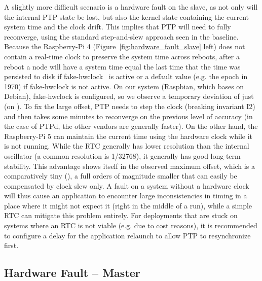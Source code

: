A slightly more difficult scenario is a hardware fault on the slave, as not only will the internal PTP state be lost, but also the kernel state containing the current system time and the clock drift. This implies that PTP will need to fully reconverge, using the standard step-and-slew approach seen in the baseline. Because the Raspberry-Pi 4 (Figure~\ref{fig:hardware_fault_slave} left) does not contain a real-time clock to preserve the system time across reboots, after a reboot a node will have a system time equal the last time that the time was persisted to disk if fake-hwclock~\cite{fake-hwclock-manpage} is active or a default value (e.g. the epoch in 1970) if fake-hwclock is not active. On our system (Raspbian, which bases on Debian), fake-hwclock is configured, so we observe a temporary deviation of just \fTimeMin{\cmpMax} (on \fVendor{\cmpMaxArg}). To fix the large offset, PTP needs to step the clock (breaking invariant I2) and then takes some minutes to reconverge on the previous level of accuracy (in the case of PTPd, the other vendors are generally faster). On the other hand, the Raspberry-Pi 5 can maintain the current time using the hardware clock while it is not running. While the RTC generally has lower resolution than the internal oscillator (a common resolution is 1/32768), it generally has good long-term stability. This advantage shows itself in the observed maximum offset, which is a comparatively tiny \fTime{\cmpMax} (\fVendor{\cmpMaxArg}), a full  orders of magnitude smaller that can easily be compensated by clock slew only. A fault on a system without a hardware clock will thus cause an application to encounter large inconsistencies in timing in a place where it might not expect it (right in the middle of a run), while a simple RTC can mitigate this problem entirely. For deployments that are stuck on systems where an RTC is not viable (e.g. due to cost reasons), it is recommended to configure a delay for the application relaunch to allow PTP to resynchronize first.

\subsection{Hardware Fault -- Master}

